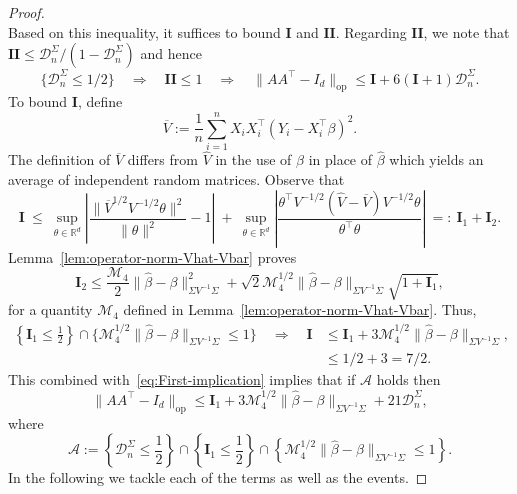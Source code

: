 \documentclass[11pt]{article}
\begin{document}
\begin{appendices}
\begin{proof}
\begin{equation}
\end{equation}
Based on this inequality, it suffices to bound $\mathbf{I}$ and $\mathbf{II}$.
Regarding $\mathbf{II}$, we note that $\mathbf{II} \le \mathcal{D}_n^{\Sigma}/(1 - \mathcal{D}_n^{\Sigma})$ and hence
\begin{equation}\label{eq:First-implication}
\{\mathcal{D}_n^{\Sigma} \le 1/2\}\quad\Rightarrow\quad \mathbf{II}\le1\quad\Rightarrow\quad \|AA^{\top} - I_d\|_{\mathrm{op}} \le \mathbf{I} + 6(\mathbf{I} + 1)\mathcal{D}_n^{\Sigma}.
\end{equation} To bound $\mathbf{I}$, define
\[
\overline{V} := \frac{1}{n}\sum_{i=1}^n X_iX_i^{\top}(Y_i - X_i^{\top}\beta)^2.
\]
The definition of $\overline{V}$ differs from $\widehat{V}$ in the use of $\beta$ in place of $\widehat{\beta}$ which yields an average of independent random matrices. Observe that
\[
\mathbf{I} ~\le~ \sup_{\theta\in\mathbb{R}^d}\left|\frac{\|\overline{V}^{1/2}V^{-1/2}\theta\|^2}{\|\theta\|^2} - 1\right| ~+~ \sup_{\theta\in\mathbb{R}^d}\left|\frac{\theta^{\top}V^{-1/2}(\widehat{V} - \overline{V})V^{-1/2}\theta}{\theta^{\top}\theta}\right| ~=:~ \mathbf{I}_1 + \mathbf{I}_{2}.
\]
Lemma~\ref{lem:operator-norm-Vhat-Vbar} proves
\[
\mathbf{I}_2 \le \frac{\mathcal{M}_4}{2}\|\widehat{\beta} - \beta\|^2_{\Sigma V^{-1}\Sigma} + \sqrt{2}\mathcal{M}_4^{1/2}\|\widehat{\beta} - \beta\|_{\Sigma V^{-1}\Sigma}\sqrt{1 + \mathbf{I}_1},
\]
for a quantity $\mathcal{M}_4$ defined in Lemma~\ref{lem:operator-norm-Vhat-Vbar}. Thus, 
\begin{equation}\label{eq:Second-implication}
\begin{split}
\left\{\mathbf{I}_1 \le \frac{1}{2}\right\}\cap\{\mathcal{M}_4^{1/2}\|\widehat{\beta} - \beta\|_{\Sigma V^{-1}\Sigma} \le 1\}\quad\Rightarrow\quad\mathbf{I} &\le \mathbf{I}_1 + 3\mathcal{M}_4^{1/2}\|\widehat{\beta} - \beta\|_{\Sigma V^{-1}\Sigma},\\
&\le 1/2 + 3 = 7/2.
\end{split}
\end{equation}
This combined with~\eqref{eq:First-implication} implies that if $\mathcal{A}$ holds then
\begin{equation}\label{eq:main-decomposition-sandwich}
\|AA^{\top} - I_d\|_{\mathrm{op}} \le \mathbf{I}_1 + 3\mathcal{M}_4^{1/2}\|\widehat{\beta} - \beta\|_{\Sigma V^{-1}\Sigma} + 21\mathcal{D}_n^{\Sigma},
\end{equation}
where
\begin{equation}\label{eq:crucial-event-sandwich}
\mathcal{A} := \left\{\mathcal{D}_n^{\Sigma} \le \frac{1}{2}\right\}\cap\left\{\mathbf{I}_1 \le \frac{1}{2}\right\}\cap\left\{\mathcal{M}_4^{1/2}\|\widehat{\beta} - \beta\|_{\Sigma V^{-1}\Sigma} \le 1\right\}.
\end{equation}
In the following we tackle each of the terms as well as the events.

\end{proof}
\end{appendices}
\end{document}
